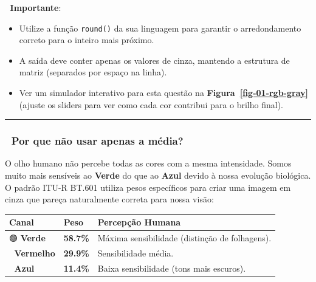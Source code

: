 \documentclass[
  portuguese,
  letterpaper,
  openany,
  oneside,
  12pt,
  a4paper]{book}
\providecommand{\tightlist}{%
  \setlength{\itemsep}{0pt}\setlength{\parskip}{0pt}}
\begin{document}
📌 \textbf{Importante}:

\begin{itemize}
\tightlist
\item
  Utilize a função \texttt{round()} da sua linguagem para garantir o
  arredondamento correto para o inteiro mais próximo.
\item
  A saída deve conter apenas os valores de cinza, mantendo a estrutura
  de matriz (separados por espaço na linha).
\item
  Ver um simulador interativo para esta questão na
  \textbf{Figura~\ref{fig-01-rgb-gray}} (ajuste os sliders para ver como
  cada cor contribui para o brilho final).
\end{itemize}

\begin{center}\rule{0.5\linewidth}{0.5pt}\end{center}

\subsubsection{🧠 Por que não usar apenas a
média?}\label{por-que-nuxe3o-usar-apenas-a-muxe9dia}

O olho humano não percebe todas as cores com a mesma intensidade. Somos
muito mais sensíveis ao \textbf{Verde} do que ao \textbf{Azul} devido à
nossa evolução biológica. O padrão ITU-R BT.601 utiliza pesos
específicos para criar uma imagem em cinza que pareça naturalmente
correta para nossa visão:

\begin{longtable}[]{@{}
  >{\raggedright\arraybackslash}p{}
  >{\raggedright\arraybackslash}p{}
  >{\raggedright\arraybackslash}p{}@{}}
\toprule\noalign{}
\begin{minipage}[b]{\linewidth}\raggedright
Canal
\end{minipage} & \begin{minipage}[b]{\linewidth}\raggedright
Peso
\end{minipage} & \begin{minipage}[b]{\linewidth}\raggedright
Percepção Humana
\end{minipage} \\
\midrule\noalign{}
\endhead
\bottomrule\noalign{}
\endlastfoot
🟢 \textbf{Verde} & \textbf{58.7\%} & Máxima sensibilidade (distinção de
folhagens). \\
🔴 \textbf{Vermelho} & \textbf{29.9\%} & Sensibilidade média. \\
🔵 \textbf{Azul} & \textbf{11.4\%} & Baixa sensibilidade (tons mais
escuros). \\
\end{longtable}
\end{document}
